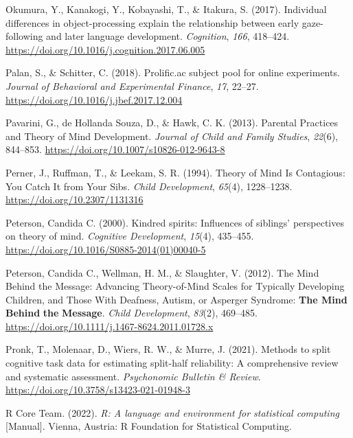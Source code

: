 \documentclass[
  man,floatsintext]{apa6}
\newlength{\cslhangindent}
\newlength{\cslentryspacingunit} %
\newenvironment{CSLReferences}[2] %
 {%
  \setlength{\parindent}{0pt}
  \ifodd #1
  \let\oldpar\par
  \def\par{\hangindent=\cslhangindent\oldpar}
  \fi
  \setlength{\parskip}{#2\cslentryspacingunit}
 }%
 {}
\begin{document}
\begin{CSLReferences}{1}{0}
\leavevmode{}%
Okumura, Y., Kanakogi, Y., Kobayashi, T., \& Itakura, S. (2017). Individual differences in object-processing explain the relationship between early gaze-following and later language development. \emph{Cognition}, \emph{166}, 418--424. \url{https://doi.org/10.1016/j.cognition.2017.06.005}

\leavevmode{}%
Palan, S., \& Schitter, C. (2018). Prolific.ac subject pool for online experiments. \emph{Journal of Behavioral and Experimental Finance}, \emph{17}, 22--27. \url{https://doi.org/10.1016/j.jbef.2017.12.004}

\leavevmode{}%
Pavarini, G., de Hollanda Souza, D., \& Hawk, C. K. (2013). Parental {Practices} and {Theory} of {Mind Development}. \emph{Journal of Child and Family Studies}, \emph{22}(6), 844--853. \url{https://doi.org/10.1007/s10826-012-9643-8}

\leavevmode{}%
Perner, J., Ruffman, T., \& Leekam, S. R. (1994). Theory of {Mind Is Contagious}: {You Catch It} from {Your Sibs}. \emph{Child Development}, \emph{65}(4), 1228--1238. \url{https://doi.org/10.2307/1131316}

\leavevmode{}%
Peterson, Candida C. (2000). Kindred spirits: {Influences} of siblings' perspectives on theory of mind. \emph{Cognitive Development}, \emph{15}(4), 435--455. \url{https://doi.org/10.1016/S0885-2014(01)00040-5}

\leavevmode{}%
Peterson, Candida C., Wellman, H. M., \& Slaughter, V. (2012). The {Mind Behind} the {Message}: {Advancing Theory-of-Mind Scales} for {Typically Developing Children}, and {Those With Deafness}, {Autism}, or {Asperger Syndrome}: {\textbf{The Mind Behind}}{ \textbf{the} }{\textbf{Message}}. \emph{Child Development}, \emph{83}(2), 469--485. \url{https://doi.org/10.1111/j.1467-8624.2011.01728.x}

\leavevmode{}%
Pronk, T., Molenaar, D., Wiers, R. W., \& Murre, J. (2021). Methods to split cognitive task data for estimating split-half reliability: {A} comprehensive review and systematic assessment. \emph{Psychonomic Bulletin \& Review}. \url{https://doi.org/10.3758/s13423-021-01948-3}

\leavevmode{}%
R Core Team. (2022). \emph{R: {A} language and environment for statistical computing} {[}Manual{]}. {Vienna, Austria}: {R Foundation for Statistical Computing}.


\end{CSLReferences}
\end{document}
